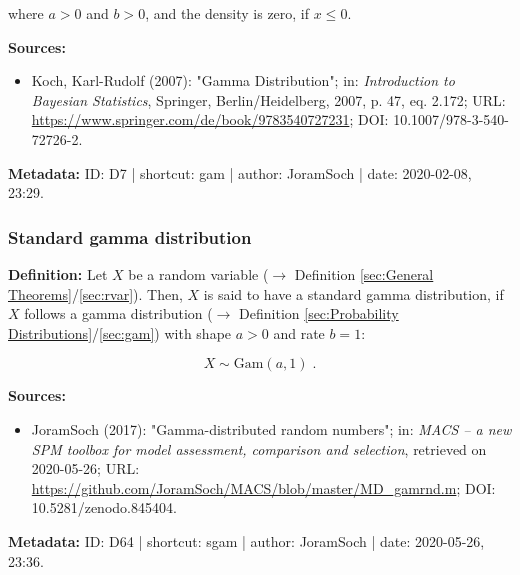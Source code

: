 \documentclass[a4paper,12pt,twoside]{book}
\begin{document}
where $a > 0$ and $b > 0$, and the density is zero, if $x \leq 0$.


\vspace{1em}
\textbf{Sources:}
\begin{itemize}
\item Koch, Karl-Rudolf (2007): "Gamma Distribution"; in: \textit{Introduction to Bayesian Statistics}, Springer, Berlin/Heidelberg, 2007, p. 47, eq. 2.172; URL: \url{https://www.springer.com/de/book/9783540727231}; DOI: 10.1007/978-3-540-72726-2.
\end{itemize}


\vspace{1em}
\textbf{Metadata:} ID: D7 | shortcut: gam | author: JoramSoch | date: 2020-02-08, 23:29.
\vspace{1em}



\subsubsection[\textit{Standard gamma distribution}]{Standard gamma distribution} \label{sec:sgam}
\setcounter{equation}{0}

\textbf{Definition:} Let $X$ be a random variable ($\rightarrow$ Definition \ref{sec:General Theorems}/\ref{sec:rvar}). Then, $X$ is said to have a standard gamma distribution, if $X$ follows a gamma distribution ($\rightarrow$ Definition \ref{sec:Probability Distributions}/\ref{sec:gam}) with shape $a > 0$ and rate $b = 1$:

\begin{equation} \label{eq:sgam-sgam}
X \sim \mathrm{Gam}(a, 1) \; .
\end{equation}


\vspace{1em}
\textbf{Sources:}
\begin{itemize}
\item JoramSoch (2017): "Gamma-distributed random numbers"; in: \textit{MACS – a new SPM toolbox for model assessment, comparison and selection}, retrieved on 2020-05-26; URL: \url{https://github.com/JoramSoch/MACS/blob/master/MD_gamrnd.m}; DOI: 10.5281/zenodo.845404.
\end{itemize}


\vspace{1em}
\textbf{Metadata:} ID: D64 | shortcut: sgam | author: JoramSoch | date: 2020-05-26, 23:36.
\vspace{1em}
\end{document}
